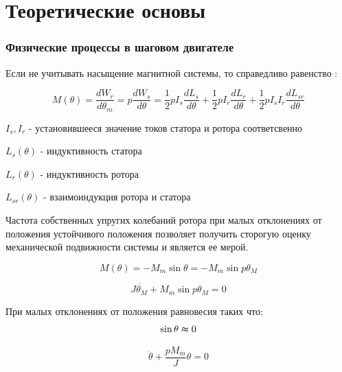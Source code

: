 \newpage
\part{ Теоретические основы }




\section{ Физические процессы в шаговом двигателе }
Если не учитывать насыщение магнитной системы, то справедливо равенство \cite[стр. 82]{Chilikin}:

\begin{equation}
\label{step_motor_torque_common}
    M(\theta)
    = \frac{dW_r}{d\theta_m}
    = p \frac{dW_s}{d\theta}
    = \frac{1}{2} p I_s \frac{dL_s}{d\theta}
        + \frac{1}{2} p I_r \frac{dL_r}{d\theta}
        + \frac{1}{2} p I_{s} I_r \frac{dL_{sr}}{d\theta}
\end{equation}

$I_{s}, I_{r}$ - установившееся значение токов статора и ротора соответсвенно

$L_{s}(\theta)$ - индуктивность статора

$L_{r}(\theta)$ - индуктивность ротора

$L_{sr}(\theta)$ - взаимоиндукция ротора и статора

Частота собственных упругих колебаний ротора \cite[гл 3.1]{Chilikin} при малых отклонениях от положения устойчивого
положения позволяет получить сторогую оценку механической подвижности системы и является ее мерой.

\begin{equation}
\label{step_motor_torque_without_load_and_with_unstable_rotor}
    M(\theta)
    = - M_{m} \sin{\theta}
    = - M_{m} \sin{p\theta_{M}}
\end{equation}

\begin{equation}
\label{step_motor_dynamic_move_equation}
    J \ddot{ \theta_{M} } + M_{m} \sin{p \theta_{M}} = 0
\end{equation}

При малых отклонениях от положения равновесия таких что:
\begin{equation}
    \sin{\theta} \thickapprox 0
\end{equation}

\begin{equation}
    \label{rotor_like_harmonical_oscilator_equation}
    \ddot{\theta} + \frac{p M_{m}}{J} \theta = 0
\end{equation}

